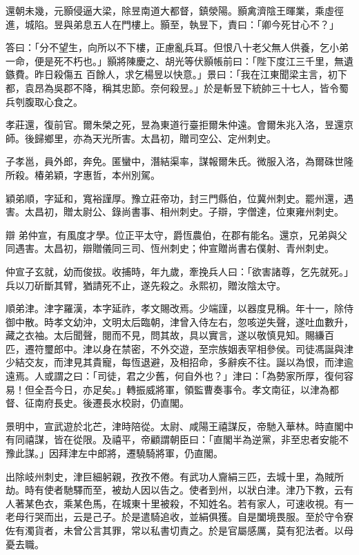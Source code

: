 \begin{pinyinscope}
 還朝未幾，元顥侵逼大梁，除昱南道大都督，鎮滎陽。顥禽濟陰王暉業，乘虛徑進，城陷。昱與弟息五人在門樓上。顥至，執昱下，責曰：「卿今死甘心不？」



 答曰：「分不望生，向所以不下樓，正慮亂兵耳。但恨八十老父無人供養，乞小弟一命，便是死不朽也。」顥將陳慶之、胡光等伏顥帳前曰：「陛下度江三千里，無遺鏃費。昨日殺傷五
 百餘人，求乞楊昱以快意。」景曰：「我在江東聞梁主言，初下都，袁昂為吳郡不降，稱其忠節。奈何殺昱。」於是斬昱下統帥三十七人，皆令蜀兵刳腹取心食之。



 孝莊還，復前官。爾朱榮之死，昱為東道行臺拒爾朱仲遠。會爾朱兆入洛，昱還京師。後歸鄉里，亦為天光所害。太昌初，贈司空公、定州刺史。



 子孝邕，員外郎，奔免。匿蠻中，潛結渠率，謀報爾朱氏。微服入洛，為爾硃世隆所殺。椿弟穎，字惠哲，本州別駕。



 穎弟順，字延和，寬裕謹厚。豫立莊帝功，封三門縣伯，位冀州刺史。罷州還，遇害。太昌初，贈太尉公、錄尚書事、相州刺史。子辯，字僧達，位東雍州刺史。



 辯
 弟仲宣，有風度才學。位正平太守，爵恆農伯，在郡有能名。還京，兄弟與父同遇害。太昌初，辯贈儀同三司、恆州刺史；仲宣贈尚書右僕射、青州刺史。



 仲宣子玄就，幼而俊拔。收捕時，年九歲，牽挽兵人曰：「欲害諸尊，乞先就死。」兵以刀斫斷其臂，猶請死不止，遂先殺之。永熙初，贈汝陰太守。



 順弟津。津字羅漢，本字延祚，孝文賜改焉。少端謹，以器度見稱。年十一，除侍御中散。時孝文幼沖，文明太后臨朝，津曾入侍左右，忽咳逆失聲，遂吐血數升，藏之衣袖。太后聞聲，閱而不見，問其故，具以實言，遂以敬慎見知。賜縑百
 匹，遷符璽郎中。津以身在禁密，不外交遊，至宗族姻表罕相參侯。司徒馮誕與津少結交友，而津見其貴寵，每恆退避，及相招命，多辭疾不往。誕以為恨，而津逾遠焉。人或謂之曰：「司徒，君之少舊，何自外也？」津曰：「為勢家所厚，復何容易！但全吾今日，亦足矣。」轉振威將軍，領監曹奏事令。孝文南征，以津為都督、征南府長史。後遷長水校尉，仍直閣。



 景明中，宣武遊於北芒，津時陪從。太尉、咸陽王禧謀反，帝馳入華林。時直閣中有同禧謀，皆在從限。及禧平，帝顧謂朝臣曰：「直閣半為逆黨，非至忠者安能不豫此謀。」因拜津左中郎將，遷驍騎將軍，仍直閣。



 出除岐州刺史，津巨細躬親，孜孜不倦。有武功人齎絹三匹，去城十里，為賊所劫。時有使者馳驛而至，被劫人因以告之。使者到州，以狀白津。津乃下教，云有人著某色衣，乘某色馬，在城東十里被殺，不知姓名。若有家人，可速收視。有一老母行哭而出，云是己子。於是遣騎追收，並絹俱獲。自是闔境畏服。至於守令寮佐有濁貨者，未曾公言其罪，常以私書切責之。於是官屬感厲，莫有犯法者。以母憂去職。




\end{pinyinscope}
